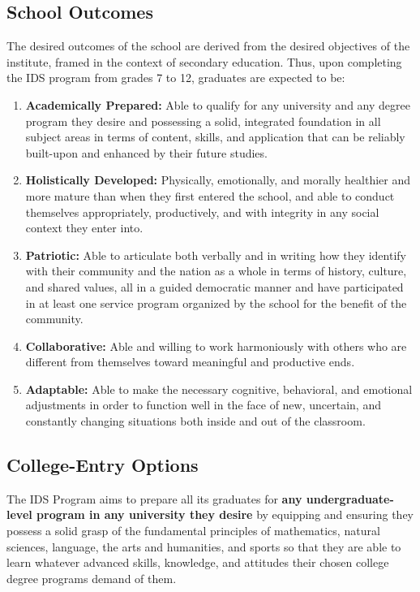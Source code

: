 \subsection{School Outcomes}
The desired outcomes of the school are derived from the desired objectives of the institute, framed in the context of secondary education. Thus, upon completing the IDS program from grades 7 to 12, graduates are expected to be:
\begin{enumerate}
	\item{\textbf{Academically Prepared:} Able to qualify for any university and any degree program they desire and
possessing a solid, integrated foundation in all subject areas in terms of content, skills, and application that can be reliably built-upon and enhanced by their future studies.}
	\item{\textbf{Holistically Developed:} Physically, emotionally, and morally healthier and more mature than when they first entered the school, and able to conduct themselves appropriately, productively, and with integrity in any social context they enter into.}
	\item{\textbf{Patriotic:} Able to articulate both verbally and in writing how they identify with their community and the nation as a whole in terms of history, culture, and shared values, all in a guided democratic manner and have participated in at least one service program organized by the school for the benefit of the community.}
	\item{\textbf{Collaborative:} Able and willing to work harmoniously with others who are different from themselves toward meaningful and productive ends.}
	\item{\textbf{Adaptable:} Able to make the necessary cognitive, behavioral, and emotional adjustments in order to function well in the face of new, uncertain, and constantly changing situations both inside and out of the classroom.}
\end{enumerate}

\subsection{College-Entry Options}
The IDS Program aims to prepare all its graduates for \textbf{any undergraduate-level program in any university they desire} by equipping and ensuring they possess a solid grasp of the fundamental principles of mathematics, natural sciences, language, the arts and humanities, and sports so that they are able to learn whatever advanced skills, knowledge, and attitudes their chosen college degree programs demand of them.